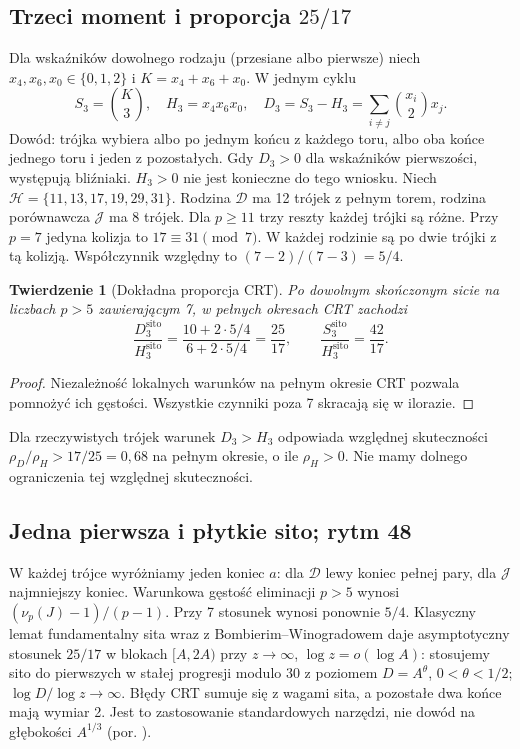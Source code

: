 \documentclass[11pt,a4paper]{article}
\newtheorem{tw}{Twierdzenie}[section]
\theoremstyle{definition}\newtheorem{defn}[tw]{Definicja}
\theoremstyle{remark}\newtheorem*{uw}{Uwaga}
\newcommand{\D}{\mathcal D}
\begin{document}
\subsection{Trzeci moment i proporcja $25/17$}
Dla wskaźników dowolnego rodzaju (przesiane albo pierwsze) niech
$x_4,x_6,x_0\in\{0,1,2\}$ i $K=x_4+x_6+x_0$. W jednym cyklu
\begin{equation}\label{eq:D3}
 S_3=\binom K3,\quad H_3=x_4x_6x_0,\quad
 D_3=S_3-H_3=\sum_{i\ne j}\binom{x_i}2x_j.
\end{equation}
Dowód: trójka wybiera albo po jednym końcu z każdego toru, albo oba końce
jednego toru i jeden z pozostałych. Gdy $D_3>0$ dla wskaźników pierwszości,
występują bliźniaki. $H_3>0$ nie jest konieczne do tego wniosku.
Niech $\mathcal H=\{11,13,17,19,29,31\}$. Rodzina $\D$ ma 12 trójek
z pełnym torem, rodzina porównawcza $\mathcal J$ ma 8 trójek.
Dla $p\ge11$ trzy reszty każdej trójki są różne. Przy $p=7$ jedyna
kolizja to $17\equiv31\pmod7$. W każdej rodzinie są po dwie trójki
z tą kolizją. Współczynnik względny to $(7-2)/(7-3)=5/4$.
\begin{tw}[Dokładna proporcja CRT]\label{th:ratio}
Po dowolnym skończonym sicie na liczbach $p>5$ zawierającym 7, w pełnych
okresach CRT zachodzi
\[
 \frac{D_3^{\mathrm{sito}}}{H_3^{\mathrm{sito}}}
 =\frac{10+2\cdot5/4}{6+2\cdot5/4}=\frac{25}{17},\qquad
 \frac{S_3^{\mathrm{sito}}}{H_3^{\mathrm{sito}}}=\frac{42}{17}.
\]
\end{tw}
\begin{proof} Niezależność lokalnych warunków na pełnym okresie CRT pozwala
pomnożyć ich gęstości. Wszystkie czynniki poza 7 skracają się w ilorazie.
\end{proof}
Dla rzeczywistych trójek warunek $D_3>H_3$ odpowiada względnej skuteczności
$\rho_D/\rho_H>17/25=0{,}68$ na pełnym okresie, o ile $\rho_H>0$.
Nie mamy dolnego ograniczenia tej względnej skuteczności.

\subsection{Jedna pierwsza i płytkie sito; rytm 48}
W każdej trójce wyróżniamy jeden koniec $a$: dla $\D$ lewy koniec pełnej
pary, dla $\mathcal J$ najmniejszy koniec. Warunkowa gęstość eliminacji
$p>5$ wynosi $(\nu_p(J)-1)/(p-1)$. Przy 7 stosunek wynosi ponownie $5/4$.
Klasyczny lemat fundamentalny sita wraz z Bombierim--Winogradowem daje
asymptotyczny stosunek $25/17$ w blokach $[A,2A)$ przy
$z\to\infty$, $\log z=o(\log A)$: stosujemy sito do pierwszych w stałej
progresji modulo 30 z poziomem $D=A^{\theta}$, $0<\theta<1/2$;
$\log D/\log z\to\infty$. Błędy CRT sumuje się z wagami sita, a
pozostałe dwa końce mają wymiar 2. Jest to zastosowanie standardowych
narzędzi, nie dowód na głębokości $A^{1/3}$ (por. \cite{taosieve}).
\end{document}
